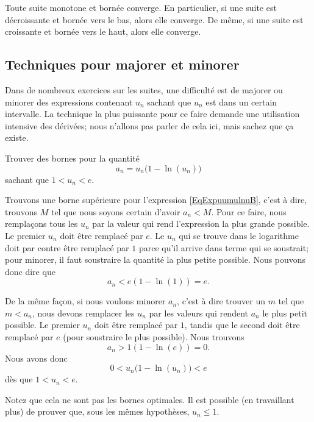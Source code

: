 \begin{proposition}		\label{Propsuiteborncv}
Toute suite monotone et bornée converge. En particulier, si une suite est décroissante et bornée vers le bas, alors elle converge. De même, si une suite est  croissante et bornée vers le haut, alors elle converge.
\end{proposition}

\subsection{Techniques pour majorer et minorer}

Dans de nombreux exercices sur les suites, une difficulté est de majorer ou minorer des expressions contenant $u_n$ sachant que $u_n$ est dans un certain intervalle. La technique la plus puissante pour ce faire demande une utilisation intensive des dérivées; nous n'allons pas parler de cela ici, mais sachez que ça existe.

\begin{example}
	Trouver	des bornes pour la quantité
	\begin{equation}		\label{EqExpuumulnuB}
		a_n=u_n\big( 1-\ln(u_n) \big)
	\end{equation}
	sachant que $1<u_n<e$.

	Trouvons une borne supérieure pour l'expression \eqref{EqExpuumulnuB}, c'est à dire, trouvons $M$ tel que nous soyons certain d'avoir $a_n<M$. Pour ce faire, nous remplaçons tous les $u_n$ par la valeur qui rend l'expression la plus grande possible. Le premier $u_n$ doit être remplacé par $e$. Le $u_n$ qui se trouve dans le logarithme doit par contre être remplacé par $1$ parce qu'il arrive dans terme qui se soustrait; pour minorer, il faut soustraire la quantité la plus petite possible. Nous pouvons donc dire que
	\begin{equation}
		a_n<e(1-\ln(1))=e.
	\end{equation}

	De la même façon, si nous voulons minorer $a_n$, c'est à dire trouver un $m$ tel que $m<a_n$, nous devons remplacer les $u_n$ par les valeurs qui rendent $a_n$ le plus petit possible. Le premier $u_n$ doit être remplacé par $1$, tandis que le second doit être remplacé par $e$ (pour soustraire le plus possible). Nous trouvons
	\begin{equation}
		a_n>1(1-\ln(e))=0.
	\end{equation}
	Nous avons donc
	\begin{equation}
		0<u_n\big( 1-\ln(u_n) \big)<e
	\end{equation}
	dès que $1<u_n<e$.

	Notez que cela ne sont pas les bornes optimales. Il est possible (en travaillant plus) de prouver que, sous les mêmes hypothèses, $u_n\leq 1$.
\end{example}

